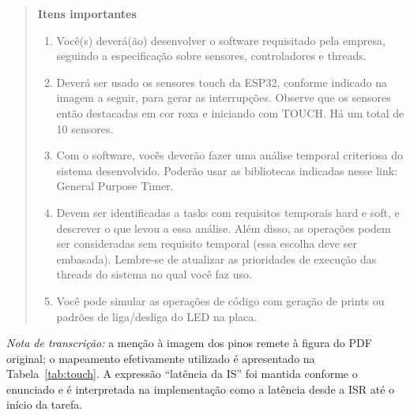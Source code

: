 \begin{quote}
\textbf{Itens importantes}
\begin{enumerate}
\item Você(s) deverá(ão) desenvolver o software requisitado pela empresa, seguindo a especificação sobre sensores, controladores e threads.
\item Deverá ser usado os sensores touch da ESP32, conforme indicado na imagem a seguir, para gerar as interrupções. Observe que os sensores então destacadas em cor roxa e iniciando com TOUCH. Há um total de 10 sensores.
\item Com o software, vocês deverão fazer uma análise temporal criteriosa do sistema desenvolvido. Poderão usar as bibliotecas indicadas nesse link: General Purpose Timer.
\item Devem ser identificadas a tasks com requisitos temporais hard e soft, e descrever o que levou a essa análise. Além disso, as operações podem ser consideradas sem requisito temporal (essa escolha deve ser embasada). Lembre-se de atualizar as prioridades de execução das threads do sistema no qual você faz uso.
\item Você pode simular as operações de código com geração de prints ou padrões de liga/desliga do LED na placa.
\end{enumerate}
\end{quote}

\noindent\textit{Nota de transcrição:} a menção à imagem dos pinos remete à figura do PDF original; o mapeamento efetivamente utilizado é apresentado na Tabela~\ref{tab:touch}. A expressão ``latência da IS'' foi mantida conforme o enunciado e é interpretada na implementação como a latência desde a ISR até o início da tarefa.

\FloatBarrier
